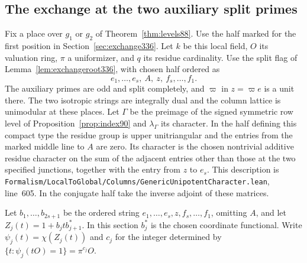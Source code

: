 \documentclass[a4paper,11pt]{article}
\theoremstyle{definition}
\theoremstyle{remark}
\newcommand{\srcloc}[2]{{\small\nolinkurl{#1.lean}}, line~#2}
\numberwithin{equation}{section}
\begin{document}
\subsection{The exchange at the two auxiliary split primes}\label{sec:auxiliaryflag339}
Fix a place over \(g_1\) or \(g_2\) of Theorem~\ref{thm:levels88}.
Use the half marked for the first position in Section~\ref{sec:exchange336}.
Let \(k\) be this local field, \(O\) its valuation ring, \(\pi\) a
uniformizer, and \(q\) its residue cardinality. Use the split flag
of Lemma~\ref{lem:exchangeroot336}, with chosen half ordered as
\[
       e_1,\ldots,e_s,\ A,\ z,\ f_s,\ldots,f_1 .
\]
The auxiliary primes are odd and split completely, and \(\varpi\)
in \(z=\varpi e\) is a unit there. The two isotropic strings are
integrally dual and the column lattice is unimodular at these
places. Let \(\Gamma\) be the preimage of the signed symmetric row
level of Proposition~\ref{prop:index90} and \(\lambda_\Gamma\)
its character. In the half defining this compact type the residue
group is upper unitriangular and the entries from the marked middle
line to \(A\) are zero. Its character is the chosen nontrivial
additive residue character on the sum of the adjacent entries other
than those at the two specified junctions, together with the
entry from \(z\) to \(e_s\). This description is
\srcloc{Formalism/LocalToGlobal/Columns/GenericUnipotentCharacter}{605}.
In the conjugate half take the inverse adjoint of these matrices.

Let \(b_1,\ldots,b_{2s+1}\) be the ordered string
\(e_1,\ldots,e_s,z,f_s,\ldots,f_1\), omitting \(A\), and let
\(Z_j(t)=1+b_jt b_{j+1}^*\). In this section \(b_j^*\) is the
chosen coordinate functional. Write \(\psi_j(t)=\chi(Z_j(t))\)
and \(c_j\) for the integer determined by
\(\{t:\psi_j(tO)=1\}=\pi^{c_j}O\).
\end{document}
